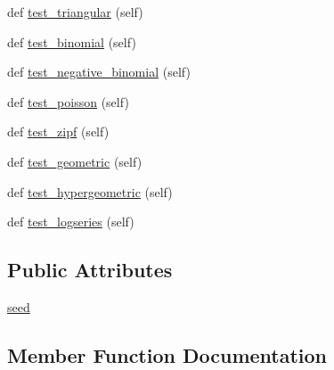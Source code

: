 \begin{DoxyCompactItemize}
\item 
def \hyperlink{classnumpy_1_1random_1_1tests_1_1test__random_1_1TestBroadcast_a54ca850d58f9f50a609b5aebe44256f4}{test\+\_\+triangular} (self)
\item 
def \hyperlink{classnumpy_1_1random_1_1tests_1_1test__random_1_1TestBroadcast_a773d738da2839959bc2ea2a3234e1fed}{test\+\_\+binomial} (self)
\item 
def \hyperlink{classnumpy_1_1random_1_1tests_1_1test__random_1_1TestBroadcast_aa25734d6e717a109671edfb5e02f1a4f}{test\+\_\+negative\+\_\+binomial} (self)
\item 
def \hyperlink{classnumpy_1_1random_1_1tests_1_1test__random_1_1TestBroadcast_a2fc67a6659f2dc91c82a6c9e99d7388a}{test\+\_\+poisson} (self)
\item 
def \hyperlink{classnumpy_1_1random_1_1tests_1_1test__random_1_1TestBroadcast_a00710c38d2291e11b48a0a05f371f122}{test\+\_\+zipf} (self)
\item 
def \hyperlink{classnumpy_1_1random_1_1tests_1_1test__random_1_1TestBroadcast_a8ea23cce447123bbde2057ee366ff2c3}{test\+\_\+geometric} (self)
\item 
def \hyperlink{classnumpy_1_1random_1_1tests_1_1test__random_1_1TestBroadcast_ad6f8c5d8ad1f35aae6a6d1dc04f9e842}{test\+\_\+hypergeometric} (self)
\item 
def \hyperlink{classnumpy_1_1random_1_1tests_1_1test__random_1_1TestBroadcast_ad2c6c71fb1effcf69574b9bf4dbb70c1}{test\+\_\+logseries} (self)
\end{DoxyCompactItemize}
\subsection*{Public Attributes}
\begin{DoxyCompactItemize}
\item 
\hyperlink{classnumpy_1_1random_1_1tests_1_1test__random_1_1TestBroadcast_a5928bac356d0bd101a2c2a314812cf0c}{seed}
\end{DoxyCompactItemize}


\subsection{Member Function Documentation}
\mbox{\label{classnumpy_1_1random_1_1tests_1_1test__random_1_1TestBroadcast_a6b370ec765ba8900b70b4ddda227857e}} 
